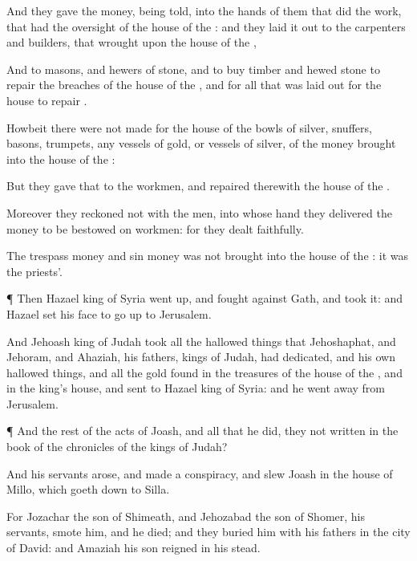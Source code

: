 {And they
gave the
money, being
told, into the
hands of them that
did the
work, that had the
oversight of the
house of the
{}: and they laid it
out to the
carpenters and
builders, that
wrought upon the
house of the
{},

And to
masons, and
hewers of
stone, and to
buy
timber and
hewed
stone to
repair the
breaches of the
house of the
{}, and for all that was laid
out for the
house to
repair
{}.

Howbeit there were not
made for the
house of the
{}
bowls of
silver,
snuffers,
basons,
trumpets, any
vessels of
gold, or
vessels of
silver, of the
money
{}
brought into the
house of the
{}:

But they
gave that to the
workmen, and
repaired therewith the
house of the
{}.

Moreover they
reckoned not with the
men, into whose
hand they
delivered the
money to be
bestowed on
workmen: for they
dealt
faithfully.

The
trespass
money and
sin
money was not
brought into the
house of the
{}: it was the
priests’.


\par }{\PP {}¶ Then
Hazael
king of
Syria went
up, and
fought against
Gath, and
took it: and
Hazael
set his
face to go
up to
Jerusalem.

And
Jehoash
king of
Judah
took all the hallowed
things that
Jehoshaphat, and
Jehoram, and
Ahaziah, his
fathers,
kings of
Judah, had
dedicated, and his own hallowed
things, and all the
gold
{}
found in the
treasures of the
house of the
{}, and in the
king’s
house, and
sent
{} to
Hazael
king of
Syria: and he went
away from
Jerusalem.


\par }{\PP {}¶ And the
rest of the
acts of
Joash, and all that he
did,
{} they not
written in the
book of the
chronicles of the
kings of
Judah?

And his
servants
arose, and
made a
conspiracy, and
slew
Joash in the
house of
Millo, which goeth
down to
Silla.

For
Jozachar the
son of
Shimeath, and
Jehozabad the
son of
Shomer, his
servants,
smote him, and he
died; and they
buried him with his
fathers in the
city of
David: and
Amaziah his
son
reigned in his stead.




}
